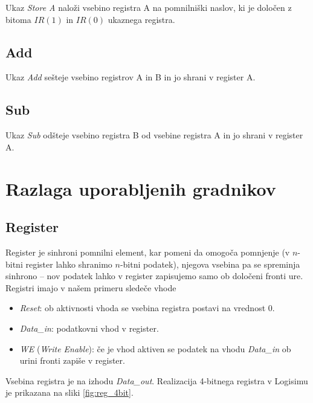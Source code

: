 Ukaz \emph{Store A} naloži vsebino registra A na pomnilniški naslov, ki je določen z bitoma $IR(1)$ in $IR(0)$ ukaznega registra.

\subsection{Add}

Ukaz \emph{Add} sešteje vsebino registrov A in B in jo shrani v register A.

\subsection{Sub}

Ukaz \emph{Sub} odšteje vsebino registra B od vsebine registra A in jo shrani v register A.


\section{Razlaga uporabljenih gradnikov}
\subsection{Register}
Register je sinhroni pomnilni element, kar pomeni da omogoča pomnjenje (v $n$-bitni register lahko shranimo $n$-bitni podatek), njegova vsebina pa se spreminja sinhrono -- nov podatek lahko v register zapisujemo samo ob določeni fronti ure. Registri imajo v našem primeru sledeče vhode
\begin{itemize}
\item \emph{Reset}: ob aktivnosti vhoda se vsebina registra postavi na vrednost 0.
\item \emph{Data\_in}: podatkovni vhod v register.
\item \emph{WE} (\emph{Write Enable}): če je vhod aktiven se podatek na vhodu \emph{Data\_in} ob urini fronti zapiše v register. 
\end{itemize}
Vsebina registra je na izhodu \emph{Data\_out}. Realizacija 4-bitnega registra v Logisimu je prikazana na sliki \ref{fig:reg_4bit}.


